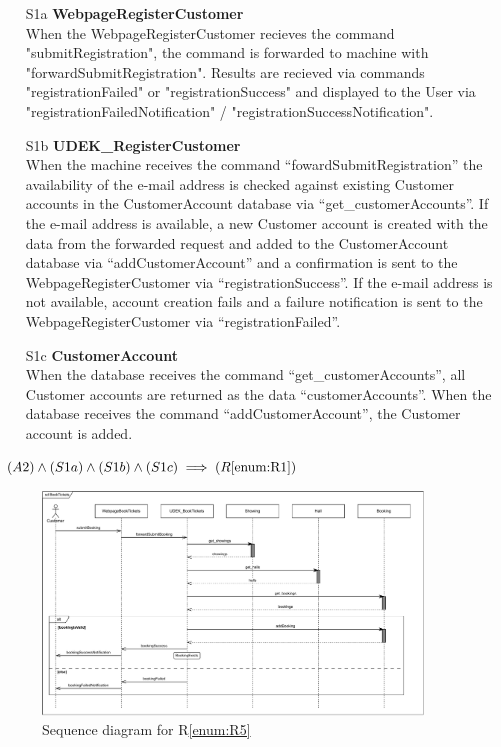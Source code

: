 \documentclass[a4paper,10pt,titlepage,bibtotoc,bibtotocnumbered]{scrreprt}
\begin{document}
\begin{itemize}
    \item[S1a] \textbf{WebpageRegisterCustomer}\\
    When the WebpageRegisterCustomer recieves the command "submitRegistration", the command is forwarded to machine with "forwardSubmitRegistration".
    Results are recieved via commands "registrationFailed" or "registrationSuccess" and displayed to the User via "registrationFailedNotification" / "registrationSuccessNotification".

    \item[S1b] \textbf{UDEK\_RegisterCustomer}\\
    When the machine receives the command ``fowardSubmitRegistration'' the availability of the e-mail address is checked against existing Customer accounts in the CustomerAccount database via ``get\_customerAccounts''.
    If the e-mail address is available, a new Customer account is created with the data from the forwarded request and added to the CustomerAccount database via ``addCustomerAccount'' and a confirmation is sent to the WebpageRegisterCustomer via ``registrationSuccess''.
    If the e-mail address is not available, account creation fails and a failure notification is sent to the WebpageRegisterCustomer via ``registrationFailed''.

    \item[S1c] \textbf{CustomerAccount}\\
    When the database receives the command ``get\_customerAccounts'', all Customer accounts are returned as the data ``customerAccounts''.
    When the database receives the command ``addCustomerAccount'', the Customer account is added.
\end{itemize}

$(A2) \land (S1a) \land (S1b) \land (S1c) \implies (R\ref{enum:R1})$

\begin{figure}[H]
\centering
\includegraphics[width=0.9\textwidth]{figures/05/a05_sequence_diagram_r05.pdf}
\caption{Sequence diagram for R\ref{enum:R5}}
\label{figure:sdR5}
\end{figure}
\end{document}
